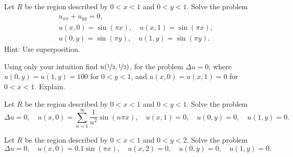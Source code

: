 \begin{exercise}
Let $R$ be the region described by $0 < x < 1$ and $0 < y < 1$.
Solve the problem
\begin{align*}
& u_{xx} + u_{yy} = 0, \\
& u(x,0) = \sin (\pi x), \quad u(x,1) = \sin (\pi x), \\
& u(0,y) = \sin (\pi y), \quad u(1,y) = \sin (\pi y) .
\end{align*}
Hint: Use superposition.
\end{exercise}

\begin{exercise}[challenging]
Using only your intuition find $u(\nicefrac{1}{2},\nicefrac{1}{2})$,
for the problem
$\Delta u = 0$, where $u(0,y) = u(1,y) = 100$ for $0 < y < 1$, and
$u(x,0) = u(x,1) = 0$ for $0 < x < 1$.  Explain.
\end{exercise}

\setcounter{exercise}{100}

\begin{exercise}
Let $R$ be the region described by $0 < x < 1$ and $0 < y < 1$.
Solve the problem
\begin{equation*}
\Delta u = 0, \quad u(x,0) = \sum_{n=1}^\infty \frac{1}{n^2} \sin (n \pi x),
\quad u(x,1) = 0,
\quad u(0,y) = 0, 
\quad u(1,y) = 0 .
\end{equation*}
\end{exercise}

\begin{exercise}
Let $R$ be the region described by $0 < x < 1$ and $0 < y < 2$.
Solve the problem
\begin{equation*}
\Delta u = 0, \quad u(x,0) = 0.1 \sin (\pi x),
\quad u(x,2) = 0,
\quad u(0,y) = 0, 
\quad u(1,y) = 0 .
\end{equation*}
\end{exercise}

%

